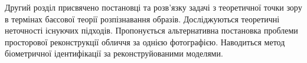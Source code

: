 Другий розділ присвячено постановці та розв'язку задачі з теоретичної точки зору
в термінах баєсової теорії розпізнавання образів.
Досліджуються теоретичні неточності існуючих підходів.
Пропонується альтернативна постановка проблеми
просторової реконструкції обличчя за однією фотографією.
Наводиться метод біометричної ідентифікації за реконструйованими моделями.
